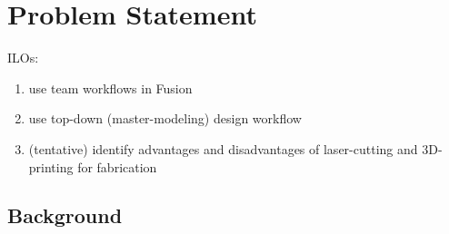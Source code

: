 \documentclass[11pt]{article}
\begin{document}
\MakeHandoutHeader





\section{Problem Statement}

ILOs:
\begin{enumerate}
    \item use team workflows in Fusion
    \item use top-down (master-modeling) design workflow
    \item (tentative) identify advantages and disadvantages of laser-cutting and 3D-printing for fabrication
\end{enumerate}

\subsection*{Background}
\end{document}
